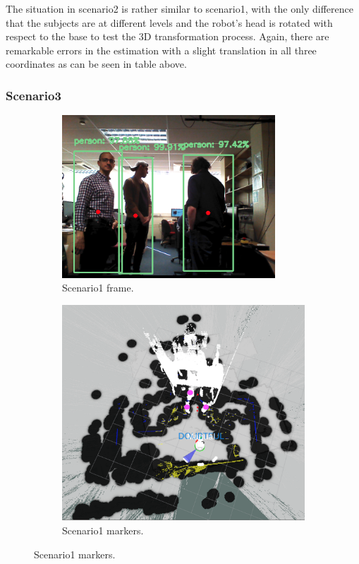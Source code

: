 The situation in scenario2 is rather similar to scenario1, with the only difference that the subjects are at different levels and the robot's head is rotated with respect to the base to test the 3D transformation process. Again, there are remarkable errors in the estimation with a slight translation in all three coordinates as can be seen in table above.

\subsubsection{Scenario3}

\begin{figure}[H]
    \begin{subfigure}{.5\textwidth}
        \centering
        \includegraphics[width=8cm]{images/chapter6_scenario3.png}
        \caption{Scenario1 frame.}
        \label{2a}
	\end{subfigure}
    \begin{subfigure}{.5\textwidth}
        \centering
        \includegraphics[width=.9\linewidth]{images/chapter6_extend3.png}
        \caption{Scenario1 markers.}
        \label{2b}
	\end{subfigure}
\end{figure}

